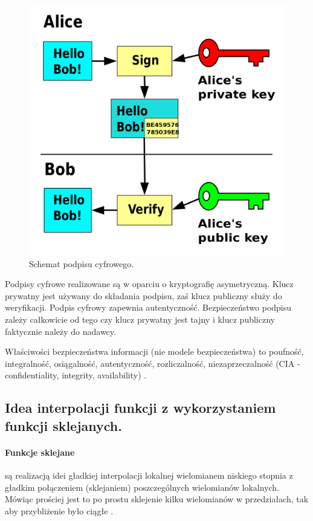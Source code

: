 \documentclass[wi]{zut}
\begin{document}
\begin{figure}[H]
    \centering
    \includegraphics[width=0.5\linewidth]{images/1200px-Private_key_signing.svg.png}
    \caption{Schemat podpisu cyfrowego.}
    \label{fig:digital_signature}
\end{figure}

Podpisy cyfrowe realizowane są w oparciu o kryptografię asymetryczną. Klucz prywatny jest używany do składania podpisu, zaś klucz publiczny służy do weryfikacji. Podpis cyfrowy zapewnia autentyczność. Bezpieczeństwo podpisu zależy całkowicie od tego czy klucz prywatny jest tajny i klucz publiczny faktycznie należy do nadawcy.

Właściwości bezpieczeństwa informacji (nie modele bezpieczeństwa) to poufność, integralność, osiągalność, autentyczność, rozliczalność, niezaprzeczalność (CIA - confidentiality, integrity, availability) \cite{Pejas}.

\question

\subsection{Idea interpolacji funkcji z wykorzystaniem funkcji sklejanych.}

\paragraph{Funkcje sklejane} są realizacją idei gładkiej interpolacji lokalnej wielomianem niskiego stopnia z gładkim połączeniem (sklejaniem) poszczególnych wielomianów lokalnych. Mówiąc prościej jest to po prostu sklejenie kilku wielomianów w przedziałach, tak aby przybliżenie było ciągłe \cite{Piela}.
\end{document}
